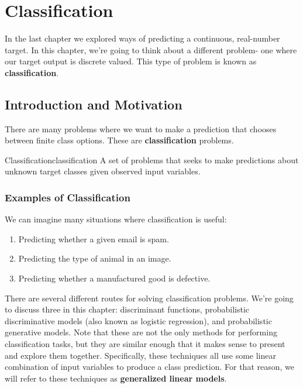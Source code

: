 \chapter{Classification}
In the last chapter we explored ways of predicting a continuous, real-number target. In this chapter, we're going to think about a different problem- one where our target output is discrete valued. This type of problem is known as \textbf{classification}.

\section{Introduction and Motivation}
There are many problems where we want to make a prediction that chooses between finite class options. These are \textbf{classification} problems.

\begin{definition}{Classification}{classification}
A set of problems that seeks to make predictions about unknown target classes given observed input variables.
\end{definition}

\subsection{Examples of Classification}
We can imagine many situations where classification is useful:
\begin{enumerate}
	\item Predicting whether a given email is spam.
    \item Predicting the type of animal in an image.
    \item Predicting whether a manufactured good is defective.
\end{enumerate}

There are several different routes for solving classification problems. We're going to discuss three in this chapter: discriminant functions, probabilistic discriminative models (also known as logistic regression), and probabilistic generative models. Note that these are not the only methods for performing classification tasks, but they are similar enough that it makes sense to present and explore them together. Specifically, these techniques all use some linear combination of input variables to produce a class prediction. For that reason, we will refer to these techniques as \textbf{generalized linear models}.


